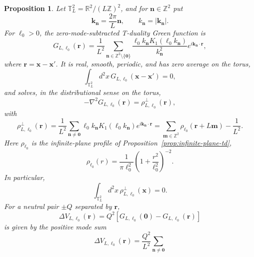 \documentclass[nopacs,amsmath,amsfonts,amssymb,aps,superscriptaddress]{revtex4}
\newtheorem{proposition}{Proposition}[section]
\begin{document}
\begin{proposition}\label{prop:square-torus-zero-mode}
Let \(\mathbb T_L^2=\mathbb R^2/(L\mathbb Z)^2\), and for \(\mathbf n\in\mathbb Z^2\) put
\begin{equation}
  \mathbf k_{\mathbf n}=\frac{2\pi}{L}\mathbf n,
  \qquad
  k_{\mathbf n}=|\mathbf k_{\mathbf n}|.
\end{equation}
For $\ell_0>0$, the zero-mode-subtracted T-duality Green function is
\begin{equation}\label{t1}
  G_{L,\ell_0}(\mathbf r)=\frac{1}{L^2}\sum_{\mathbf n\in\mathbb Z^2\setminus\{\mathbf 0\}}
  \frac{\ell_0 k_{\mathbf n}K_1(\ell_0 k_{\mathbf n})}{k_{\mathbf n}^2}
  e^{i\mathbf k_{\mathbf n}\cdot\mathbf r},
\end{equation}
where \(\mathbf r=\mathbf x-\mathbf x'\). It is real, smooth, periodic, and has zero average on the torus,
\begin{equation}
  \int_{\mathbb T_L^2}d^2x\,G_{L,\ell_0}(\mathbf x-\mathbf x')=0,
\end{equation}
and solves, in the distributional sense on the torus,
\begin{equation}
  -\nabla^2G_{L,\ell_0}(\mathbf r)=\rho_{L,\ell_0}^{\perp}(\mathbf r),
\end{equation}
with
\begin{equation}
\rho_{L,\ell_0}^{\perp}(\mathbf r)=\frac{1}{L^2}\sum_{\mathbf n\neq\mathbf 0}\ell_0 k_{\mathbf n}K_1(\ell_0 k_{\mathbf n})e^{i\mathbf k_{\mathbf n}\cdot\mathbf r}=\sum_{\mathbf m\in\mathbb Z^2}\rho_{\ell_0}(\mathbf r+L\mathbf m)-\frac{1}{L^2}.
\end{equation}
Here \(\rho_{\ell_0}\) is the infinite-plane profile of Proposition~\ref{prop:infinite-plane-td},
\begin{equation}
  \rho_{\ell_0}(r)=\frac{1}{\pi\ell_0^2}\left(1+\frac{r^2}{\ell_0^2}\right)^{-2}.
\end{equation}
In particular,
\begin{equation}
  \int_{\mathbb T_L^2}d^2x\,\rho_{L,\ell_0}^{\perp}(\mathbf x)=0.
\end{equation}
For a neutral pair \(\pm Q\) separated by \(\mathbf r\),
\begin{equation}
  \Delta V_{L,\ell_0}(\mathbf r)=Q^2\left[G_{L,\ell_0}(\mathbf 0)-G_{L,\ell_0}(\mathbf r)\right]
\end{equation}
is given by the positive mode sum
\begin{equation}\label{DVT}
\Delta V_{L,\ell_0}(\mathbf r)=\frac{Q^2}{L^2}\sum_{\mathbf n\neq\mathbf 0}

\end{equation}
\end{proposition}
\end{document}
